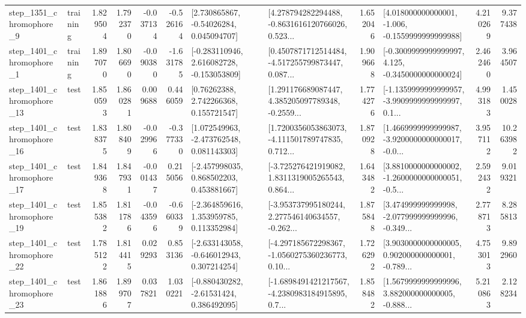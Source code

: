 \begin{tabular}{llrrrrllrlrr}
  step\_1351\_chromophore\_9 &  training &      1.829504 &    1.792370 &     -0.037134 & -0.526164 &     [2.730865867, -0.54026284, 0.045094707] &  [4.278794282294488, -0.8631616120766026, 0.523... &       1.652046 &   [4.018000000000001, -1.006, -0.1559999999999988] &            4.210269 &          9.377438 \\
  step\_1401\_chromophore\_1 &  training &      1.897070 &    1.806690 &     -0.090380 & -1.631785 &   [-0.283110946, 2.616082728, -0.153053809] &  [0.4507871712514484, -4.517255799873447, 0.087... &       1.909668 &  [-0.3009999999999997, 4.125, -0.3450000000000024] &            2.462460 &          3.964507 \\
 step\_1401\_chromophore\_13 &      test &      1.850593 &    1.860281 &      0.009688 &  0.446059 &      [0.76262388, 2.742266368, 0.155721547] &  [1.291176689087447, 4.385205097789348, -0.2559... &       1.774276 &  [-1.1359999999999957, -3.9909999999999997, 0.1... &            4.993183 &          1.450028 \\
 step\_1401\_chromophore\_16 &      test &      1.838375 &    1.808409 &     -0.029966 & -0.377330 &    [1.072549963, -2.473762548, 0.081143303] &  [1.7200356053863073, -4.111501789747835, 0.712... &       1.870928 &  [1.4669999999999987, -3.9200000000000017, -0.0... &            3.957112 &         10.263982 \\
 step\_1401\_chromophore\_17 &      test &      1.849368 &    1.847931 &     -0.001437 &  0.215056 &    [-2.457998035, 0.868502203, 0.453881667] &  [-3.725276421919082, 1.8311319005265543, 0.864... &       1.643482 &  [3.8810000000000002, -1.2600000000000051, -0.5... &            2.592432 &          9.019321 \\
 step\_1401\_chromophore\_19 &      test &      1.855382 &    1.811786 &     -0.043596 & -0.660339 &    [-2.364859616, 1.353959785, 0.113352984] &  [-3.953737995180244, 2.277546140634557, -0.262... &       1.875848 &  [3.474999999999998, -2.077999999999996, -0.349... &            2.778713 &          8.285813 \\
 step\_1401\_chromophore\_22 &      test &      1.785122 &    1.814415 &      0.029293 &  0.853136 &   [-2.633143058, -0.646012943, 0.307214254] &  [-4.297185672298367, -1.0560275360236773, 0.10... &       1.726292 &  [3.9030000000000005, 0.902000000000001, -0.789... &            4.753013 &          9.892960 \\
 step\_1401\_chromophore\_23 &      test &      1.861886 &    1.899707 &      0.037821 &  1.030221 &    [-0.880430282, -2.61531424, 0.386492095] &  [-1.6898491421217567, -4.2380983184915895, 0.7... &       1.858482 &  [1.5679999999999996, 3.882000000000005, -0.888... &            5.210863 &          2.128234 \\

\end{tabular}
